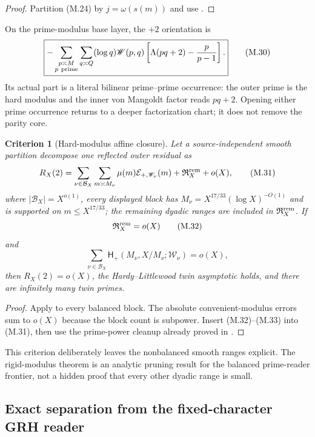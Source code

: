 \documentclass[11pt]{article}
\newtheorem{criterion}[theorem]{Criterion}
\theoremstyle{definition}
\theoremstyle{remark}
\begin{document}
\begin{proof}
Partition \textup{(M.24)} by $j=\omega(s(m))$ and use
.
\end{proof}

On the prime-modulus base layer, the $+2$ orientation is
\[
 \boxed{
 -\sum_{\substack{p\asymp M\\ p\ {\rm prime}}}
  \sum_{q\asymp Q}(\log q)\mathscr W(p,q)
  \left[\Lambda(pq+2)-\frac{p}{p-1}\right].}
 \tag{M.30}
\]
Its actual part is a literal bilinear prime--prime occurrence: the outer
prime is the hard modulus and the inner von Mangoldt factor reads $pq+2$.
Opening either prime occurrence returns to a deeper factorization chart; it
does not remove the parity core.

\begin{criterion}[Hard-modulus affine closure]
\label{crit:hard-affine-closure}
Let a source-independent smooth partition decompose one reflected outer
residual as
\[
 R_X(2)
 =\sum_{\nu\in\mathcal B_X}
   \sum_{m\asymp M_\nu}
    \mu(m)\mathcal E_{+,\mathscr W_\nu}(m)
  +\mathfrak R_X^{\rm rem}+o(X),
 \tag{M.31}
\]
where $|\mathcal B_X|=X^{o(1)}$, every displayed block has
$M_\nu=X^{17/33}(\log X)^{-O(1)}$ and is supported on
$m\le X^{17/33}$; the remaining dyadic ranges are included in
$\mathfrak R_X^{\rm rem}$.  If
\[
 \mathfrak R_X^{\rm rem}=o(X)
 \tag{M.32}
\]
and
\[
 \sum_{\nu\in\mathcal B_X}
 \mathsf H_+(M_\nu,X/M_\nu;\mathscr W_\nu)=o(X),
 \tag{M.33}
\]
then $R_X(2)=o(X)$, the Hardy--Littlewood twin asymptotic holds, and there
are infinitely many twin primes.
\end{criterion}

\begin{proof}
Apply  to every balanced block.  The absolute
convenient-modulus errors sum to $o(X)$ because the block count is
subpower.  Insert \textup{(M.32)}--\textup{(M.33)} into \textup{(M.31)},
then use the prime-power cleanup already proved in
.
\end{proof}

This criterion deliberately leaves the nonbalanced smooth ranges explicit.
The rigid-modulus theorem is an analytic pruning result for the balanced
prime-reader frontier, not a hidden proof that every other dyadic range is
small.

\subsection{Exact separation from the fixed-character GRH reader}
\end{document}
